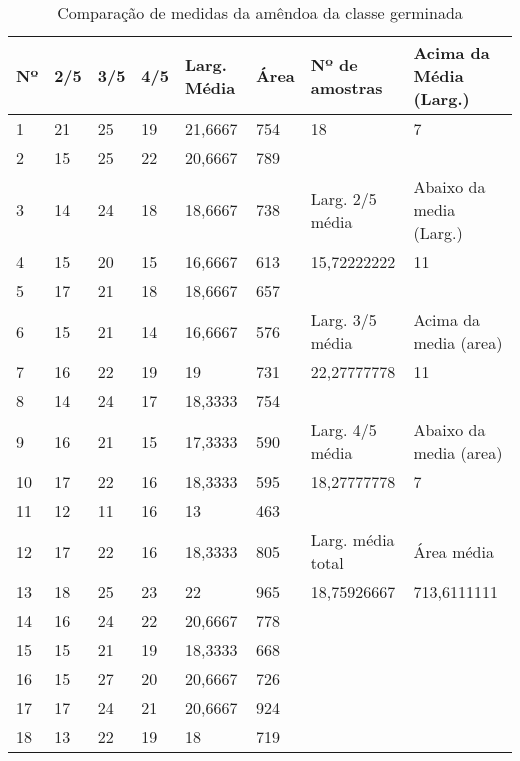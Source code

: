 \begin{anexosenv}
\begin{table}[hbtp!]
\centering
\caption{Comparação de medidas da amêndoa da classe germinada}
\label{tab:medidas_classe_germinada}
\begin{tabular}{|l|l|l|l|l|l|l|l|}
\hline
Nº & 2/5 & 3/5 & 4/5 & Larg. Média & Área & Nº de amostras & Acima da Média (Larg.) \\ \hline
1  & 21  & 25  & 19  & 21,6667     & 754  & 18               & 7                      \\
2  & 15  & 25  & 22  & 20,6667     & 789  &                  &                        \\\cline{7-8}
3  & 14  & 24  & 18  & 18,6667     & 738  & \multicolumn{1}{l|}{Larg. 2/5 média}   & \multicolumn{1}{l|}{Abaixo da media (Larg.)} \\\cline{7-8}
4  & 15  & 20  & 15  & 16,6667     & 613  & 15,72222222      & 11                     \\
5  & 17  & 21  & 18  & 18,6667     & 657  &                  &                        \\\cline{7-8}
6  & 15  & 21  & 14  & 16,6667     & 576  & \multicolumn{1}{l|}{Larg. 3/5 média}   & \multicolumn{1}{l|}{Acima da media (area)}  \\\cline{7-8}
7  & 16  & 22  & 19  & 19          & 731  & 22,27777778      & 11                     \\
8  & 14  & 24  & 17  & 18,3333     & 754  &                  &                        \\\cline{7-8}
9  & 16  & 21  & 15  & 17,3333     & 590  & \multicolumn{1}{l|}{Larg. 4/5 média}   & \multicolumn{1}{l|}{Abaixo da media (area)} \\\cline{7-8}
10 & 17  & 22  & 16  & 18,3333     & 595  & 18,27777778      & 7                      \\
11 & 12  & 11  & 16  & 13          & 463  &                  &                        \\\cline{7-8}
12 & 17  & 22  & 16  & 18,3333     & 805  & Larg. média total & \multicolumn{1}{l|}{Área média}             \\\cline{7-8}
13 & 18  & 25  & 23  & 22          & 965  & 18,75926667      & 713,6111111            \\
14 & 16  & 24  & 22  & 20,6667     & 778  &                  &                        \\
15 & 15  & 21  & 19  & 18,3333     & 668  &                  &                        \\
16 & 15  & 27  & 20  & 20,6667     & 726  &                  &                        \\
17 & 17  & 24  & 21  & 20,6667     & 924  &                  &                        \\
18 & 13  & 22  & 19  & 18          & 719  &                  &                       \\\hline
\end{tabular}
\end{table}


\end{anexosenv}
